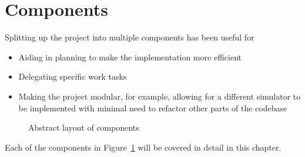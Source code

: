 \documentclass[../dissertation.tex]{subfiles}
\begin{document}
\section{Components}

Splitting up the project into multiple components has been useful for
\begin{itemize}
  \item Aiding in planning to make the implementation more efficient
  \item Delegating specific work tasks
  \item Making the project modular, for example, allowing for a different simulator
    to be implemented with minimal need to refactor other parts of the codebase
\end{itemize}

\begin{figure}[!h]
\centering
  \label{fig:abstract}
  \caption{Abstract layout of components}
\end{figure}

Each of the components in Figure~\ref{fig:abstract} will be covered in detail in this
chapter.


\end{document}
